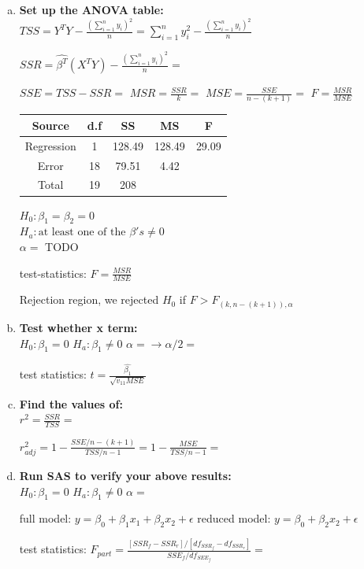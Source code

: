 \documentclass{article}
\begin{document}
\begin{enumerate}[(a)]
\item \textbf{Set up the ANOVA table: } \\
$TSS = Y^TY - \frac{(\sum_{i=1}^{n}{y_i})^2}{n} = \sum_{i=1}^{n}{y_i^2} - \frac{(\sum_{i=1}^{n}{y_i})^2}{n} $

$SSR = \hat{\beta^T}(X^TY)  - \frac{(\sum_{i=1}^{n}{y_i})^2}{n}  = $

$SSE = TSS - SSR = $
$MSR = \frac{SSR}{k} = $
$MSE = \frac{SSE}{n-(k+1)} = $
$F = \frac{MSR}{MSE}$

\begin{center}
 \begin{tabular}{||c c c c c||} 
 \hline
Source & d.f & SS & MS & F \\ [0.5ex] 
 \hline\hline
Regression & 1 & 128.49 & 128.49 & 29.09 \\
 \hline
Error & 18 & 79.51 & 4.42 &  \\
 \hline
Total & 19  & 208 & & \\ [1ex]
 \hline
\end{tabular}
\end{center}

$H_0: \beta_1 = \beta_2 = 0$ \\
$H_a: \text{at least one of the } \beta's \neq 0$ \\
$\alpha = $ TODO

test-statistics: $F = \frac{MSR}{MSE}$

Rejection region, we rejected $H_0$ if $F > F_{(k, n-(k+1)), \alpha}$

\item \textbf{Test whether x term: } \\

$H_0: \beta_1 = 0$
$H_a: \beta_1 \neq 0$
$\alpha = \to \alpha/2 =  $

test statistics: $t = \frac{\hat{\beta_1}}{\sqrt{v_{11}MSE}}$

\item \textbf{Find the values of: } \\

$r^2 = \frac{SSR}{TSS} = $

$r_{adj}^2 = 1 - \frac{SSE/n-(k+1)}{TSS/n-1} = 1 - \frac{MSE}{TSS/n-1}= $

\item \textbf{Run SAS to verify your above results: } \\

$H_0: \beta_1 = 0$
$H_a: \beta_1 \neq 0$
$\alpha = $

full model: $y = \beta_0 + \beta_1x_1 + \beta_2x_2 + \epsilon$
reduced model: $y = \beta_0 + \beta_2x_2 + \epsilon$

test statistics:
$F_{part} = \frac{ [SSR_f - SSR_r] / [df_{SSR_f} - df_{SSR_r} ] }{ SSE_f / df_{SEE_f} } = $


\end{enumerate}
\end{document}
